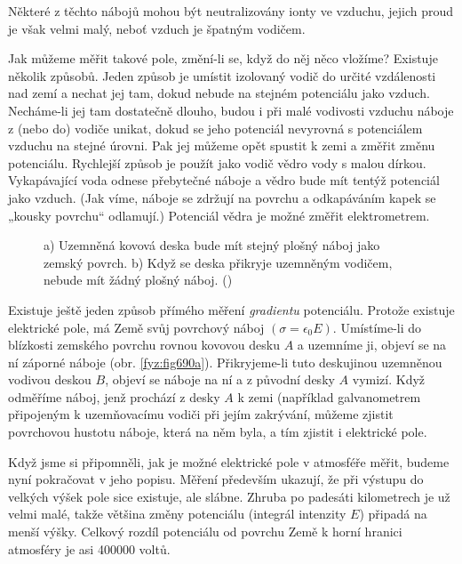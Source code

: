     Některé z těchto nábojů mohou být neutralizovány ionty ve vzduchu, jejich proud je však velmi
    malý, neboť vzduch je špatným vodičem.

    Jak můžeme měřit takové pole, změní-li se, když do něj něco vložíme? Existuje několik způsobů.
    Jeden způsob je umístit izolovaný vodič do určité vzdálenosti nad zemí a nechat jej tam, dokud
    nebude na stejném potenciálu jako vzduch. Necháme-li jej tam dostatečně dlouho, budou i při malé
    vodivosti vzduchu náboje z (nebo do) vodiče unikat, dokud se jeho potenciál nevyrovná s
    potenciálem vzduchu na stejné úrovni. Pak jej můžeme opět spustit k zemi a změřit změnu
    potenciálu. Rychlejší způsob je použít jako vodič vědro vody s malou dírkou. Vykapávající voda
    odnese přebytečné náboje a vědro bude mít tentýž potenciál jako vzduch. (Jak víme, náboje se
    zdržují na povrchu a odkapáváním kapek se „kousky povrchu“ odlamují.) Potenciál vědra je možné
    změřit elektrometrem.

    \begin{figure}[ht!]
      \centering
                     \newline
      \caption{a) Uzemněná kovová deska bude mít stejný plošný náboj jako zemský povrch.
               b) Když se deska přikryje uzemněným vodičem, nebude mít žádný plošný náboj.
               (\cite[s.~707]{Feynman02})}
      \label{fyz:fig690}
    \end{figure}

    Existuje ještě jeden způsob přímého měření \emph{gradientu} potenciálu. Protože existuje
    elektrické pole, má Země svůj povrchový náboj \((σ=ϵ_0E)\). Umístíme-li do blízkosti zemského
    povrchu rovnou kovovou desku \(A\) a uzemníme ji, objeví se na ní záporné náboje (obr.
    \ref{fyz:fig690a}). Přikryjeme-li tuto deskujinou uzemněnou vodivou deskou \(B\), objeví se
    náboje na ní a z původní desky \(A\) vymizí. Když odměříme náboj, jenž prochází z desky \(A\) k
    zemi (například galvanometrem připojeným k uzemňovacímu vodiči při jejím zakrývání, můžeme
    zjistit povrchovou hustotu náboje, která na něm byla, a tím zjistit i elektrické pole.

    Když jsme si připomněli, jak je možné elektrické pole v atmosféře měřit, budeme nyní pokračovat
    v jeho popisu. Měření především ukazují, že při výstupu do velkých výšek pole sice existuje, ale
    slábne. Zhruba po padesáti kilometrech je už velmi malé, takže většina změny potenciálu
    (integrál intenzity \(E\)) připadá na menší výšky. Celkový rozdíl potenciálu od povrchu Země k
    horní hranici atmosféry je asi \num{400000} voltů.

